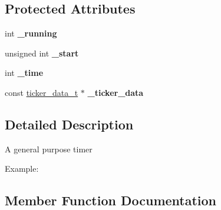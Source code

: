\subsection*{Protected Attributes}
\begin{DoxyCompactItemize}
\item 
int {\bfseries \+\_\+running}\hypertarget{classmbed_1_1Timer_a4d3e749708de44d051e90d49d58ac4b4}{}\label{classmbed_1_1Timer_a4d3e749708de44d051e90d49d58ac4b4}

\item 
unsigned int {\bfseries \+\_\+start}\hypertarget{classmbed_1_1Timer_a5a1304be7ee97acd4a532be2ca565fcc}{}\label{classmbed_1_1Timer_a5a1304be7ee97acd4a532be2ca565fcc}

\item 
int {\bfseries \+\_\+time}\hypertarget{classmbed_1_1Timer_a63b5673835238bd5a6ba309a55712d78}{}\label{classmbed_1_1Timer_a63b5673835238bd5a6ba309a55712d78}

\item 
const \hyperlink{structticker__data__t}{ticker\+\_\+data\+\_\+t} $\ast$ {\bfseries \+\_\+ticker\+\_\+data}\hypertarget{classmbed_1_1Timer_a7e3f16c5747dd07da0980f6107d4e7de}{}\label{classmbed_1_1Timer_a7e3f16c5747dd07da0980f6107d4e7de}

\end{DoxyCompactItemize}


\subsection{Detailed Description}
A general purpose timer

Example\+: 
 

\subsection{Member Function Documentation}
